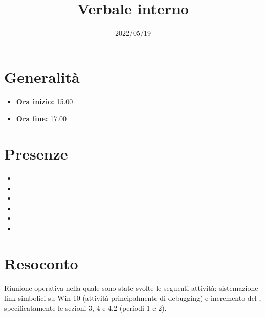 \documentclass{classes/base}
\title{Verbale interno}
\date{2022/05/19}
\author{\marcob}
\renewcommand{\maketitle}{
    
}
\begin{document}
    \maketitle

    \section*{Generalità}
    \begin{itemize}
        \item \textbf{Ora inizio:} 15.00
        \item \textbf{Ora fine:} 17.00
    \end{itemize}

    \section*{Presenze}
    \begin{itemize}
        \item \tommaso
        \item \marcob
        \item \marcov
        \item \angela
        \item \giulio
        \item \ruth
    \end{itemize}

    \section*{Resoconto}
    Riunione operativa nella quale sono state svolte le seguenti attività: sistemazione link simbolici 
    su Win 10 (attività principalmente di debugging) e incremento del \PdP, specificatamente le sezioni
    3, 4 e 4.2 (periodi 1 e 2). 
\end{document}
